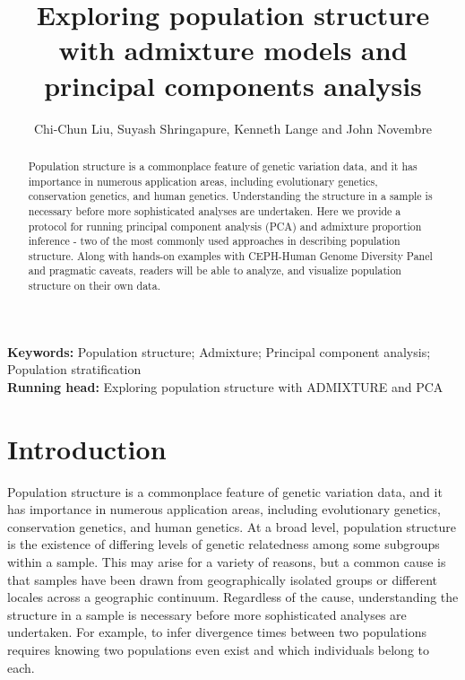 \documentclass{svmult}       %
\begin{document}
\title{Exploring population structure with admixture models and principal
components analysis }


\author{  Chi-Chun Liu,  Suyash Shringapure,  Kenneth Lange and  John Novembre }




\maketitle
\newpage
\doublespacing

\begin{abstract}
Population structure is a commonplace feature of genetic variation data,
and it has importance in numerous application areas, including
evolutionary genetics, conservation genetics, and human genetics.
Understanding the structure in a sample is necessary before more
sophisticated analyses are undertaken. Here we provide a protocol for
running principal component analysis (PCA) and admixture proportion
inference - two of the most commonly used approaches in describing
population structure. Along with hands-on examples with CEPH-Human
Genome Diversity Panel and pragmatic caveats, readers will be able to
analyze, and visualize population structure on their own data.
\end{abstract}


\textbf{Keywords:} Population structure; Admixture; Principal component analysis; Population stratification\\[5mm]

\textbf{Running head:} Exploring population structure with ADMIXTURE and PCA\\

\section{Introduction}\label{introduction}

Population structure is a commonplace feature of genetic variation data,
and it has importance in numerous application areas, including
evolutionary genetics, conservation genetics, and human genetics. At a
broad level, population structure is the existence of differing levels
of genetic relatedness among some subgroups within a sample. This may
arise for a variety of reasons, but a common cause is that samples have
been drawn from geographically isolated groups or different locales
across a geographic continuum. Regardless of the cause, understanding
the structure in a sample is necessary before more sophisticated
analyses are undertaken. For example, to infer divergence times between
two populations requires knowing two populations even exist and which
individuals belong to each.
\end{document}
